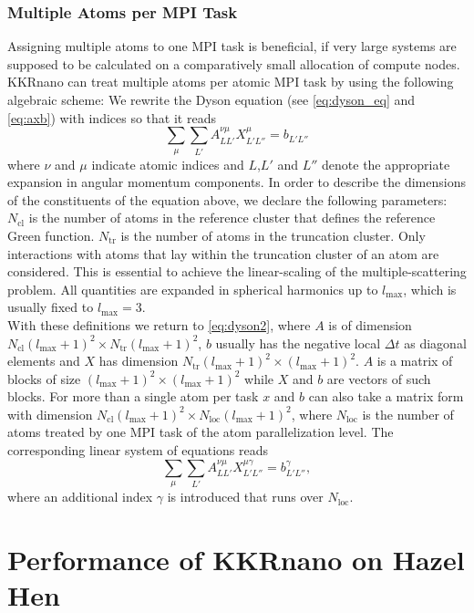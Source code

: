 \documentclass [a4paper, 12pt]{article}
\newcommand{\beq}{\begin{equation}}
\newcommand{\eeq}{\end{equation}}
\begin{document}
\subsubsection*{Multiple Atoms per MPI Task}

Assigning multiple atoms to one MPI task is beneficial, if very large systems are
supposed to be calculated on a comparatively small allocation of compute nodes.
\\
KKRnano can treat multiple atoms per atomic MPI task by using the following algebraic scheme: 
We rewrite the Dyson equation (see \cref{eq:dyson_eq} and \cref{eq:axb}) with indices so that it reads
\beq
\sum_{\mu} \sum_{L'} A^{\nu \mu}_{LL'} X^{\mu}_{L'L''} = b_{L'L''}
\label{eq:dyson2}
\eeq
where $\nu$ and $\mu$ indicate atomic indices and $L$,$L'$ and $L''$ denote
the appropriate expansion in angular momentum components.
In order to describe the dimensions of the constituents of the equation above, we
declare the following parameters:
$N_{\text{cl}}$ is the number of atoms in the reference cluster that defines the reference Green function.
$N_{\text{tr}}$ is the number of atoms in the truncation cluster. Only interactions with atoms that lay 
within the truncation cluster of an atom are considered. This is essential to achieve
the linear-scaling of the multiple-scattering problem. 
All quantities are expanded in spherical harmonics up to $l_{\text{max}}$, which is usually fixed to
$l_{\text{max}}=3$.
\\
With these definitions we return to \cref{eq:dyson2}, where $A$ is of dimension 
$N_{\text{cl}} (l_{\text{max}}+1)^2 \times N_{\text{tr}} (l_{\text{max}}+1)^2$,
$b$ usually has the
negative local $\Delta t$ as diagonal elements
and $X$ has dimension $N_{\text{tr}} (l_{\text{max}}+1)^2 \times (l_{\text{max}}+1)^2$.
$A$ is a matrix of blocks of size ${(l_{\text{max}}+1)}^2 \times {(l_{\text{max}}+1)}^2$
while $X$ and $b$ are vectors
of such blocks. For more than a single atom per task $x$ and $b$ can also take a matrix form
with dimension $N_{\text{cl}} (l_{\text{max}}+1)^2 \times N_{\text{loc}} (l_{\text{max}}+1)^2$, where
$N_{\text{loc}}$ is the number of atoms treated by one MPI task of the atom parallelization level.
The corresponding linear system of equations reads
\beq
\label{eq:dyson_equation_lap_multi}
\sum_{\mu} \sum_{L'} A^{\nu \mu}_{LL'} X^{\mu \gamma}_{L'L''} = b^{\gamma}_{L'L''},
\eeq
where an additional index $\gamma$ is introduced that runs over $N_{\text{loc}}$. 

\section{Performance of KKRnano on Hazel Hen}
\label{sec:performance}
\end{document}
